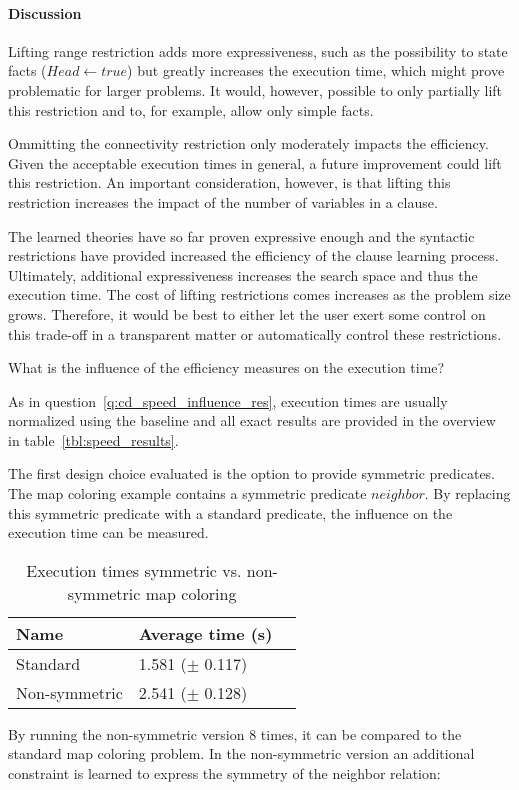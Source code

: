\paragraph{Discussion}

Lifting range restriction adds more expressiveness, such as the possibility to state facts ($Head \leftarrow true$) but greatly increases the execution time, which might prove problematic for larger problems.
It would, however, possible to only partially lift this restriction and to, for example, allow only simple facts.

Ommitting the connectivity restriction only moderately impacts the efficiency.
Given the acceptable execution times in general, a future improvement could lift this restriction.
An important consideration, however, is that lifting this restriction increases the impact of the number of variables in a clause.

The learned theories have so far proven expressive enough and the syntactic restrictions have provided increased the efficiency of the clause learning process.
Ultimately, additional expressiveness increases the search space and thus the execution time.
The cost of lifting restrictions comes increases as the problem size grows.
Therefore, it would be best to either let the user exert some control on this trade-off in a transparent matter or automatically control these restrictions.

\begin{question}
	What is the influence of the efficiency measures on the execution time?
\end{question}

As in question~\ref{q:cd_speed_influence_res}, execution times are usually normalized using the baseline and all exact results are provided in the overview in table~\ref{tbl:speed_results}.

\begin{experiment}
	The first design choice evaluated is the option to provide symmetric predicates.
	The map coloring example contains a symmetric predicate $\mathit{neighbor}$.
	By replacing this symmetric predicate with a standard predicate, the influence on the execution time can be measured.

	\begin{table}[!htp]
		\begin{tabularx}{\textwidth}{XXX}
			\textbf{Name}	& \textbf{Average time (s)}	 \\
			\toprule
			Standard 		& 1.581 ($\pm$ 0.117) \\
			Non-symmetric 	& 2.541 ($\pm$ 0.128) \\
		\end{tabularx}
		\caption{Execution times symmetric vs. non-symmetric map coloring}
		\label{tbl:exp_speed_symm}
	\end{table}

	By running the non-symmetric version $8$ times, it can be compared to the standard map coloring problem.
	In the non-symmetric version an additional constraint is learned to express the symmetry of the neighbor relation: 
\end{experiment}

